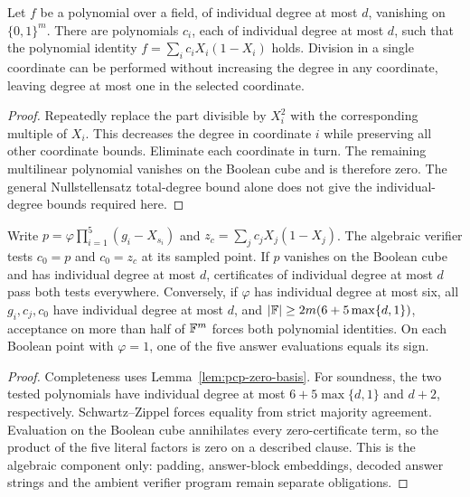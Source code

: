 \begin{lemma}
\label{lem:pcp-zero-basis}
\leanok
Let $f$ be a polynomial over a field, of individual degree at most $d$, vanishing
on $\{0,1\}^m$. There are polynomials $c_i$, each of individual degree at most $d$,
such that the polynomial identity $f=\sum_i c_i X_i(1-X_i)$ holds.
Division in a single coordinate can be performed without increasing the degree in
any coordinate, leaving degree at most one in the selected coordinate.
\end{lemma}

\begin{proof}
\leanok
Repeatedly replace the part divisible by $X_i^2$ with the corresponding multiple
of $X_i$. This decreases the degree in coordinate $i$ while preserving all other
coordinate bounds. Eliminate each coordinate in turn. The remaining multilinear
polynomial vanishes on the Boolean cube and is therefore zero. The general
Nullstellensatz total-degree bound alone does not give the individual-degree
bounds required here.
\end{proof}

\begin{lemma}
\label{lem:pcp-algebra-tests}
\leanok
Write $p=\varphi\prod_{i=1}^5(g_i-X_{s_i})$ and
$z_c=\sum_j c_jX_j(1-X_j)$. The algebraic verifier tests $c_0=p$ and $c_0=z_c$
at its sampled point. If $p$ vanishes on the Boolean cube and has individual
degree at most $d$, certificates of individual degree at most $d$ pass both tests
everywhere. Conversely, if $\varphi$ has individual degree at most six, all
$g_i,c_j,c_0$ have individual degree at most $d$, and
$|\mathbb{F}|\geq 2m(6+5\max\{d,1\})$, acceptance on more than half of $\mathbb{F}^m$ forces
both polynomial identities. On each Boolean point with $\varphi=1$, one of the
five answer evaluations equals its sign.
\end{lemma}

\begin{proof}
\leanok
Completeness uses Lemma~\ref{lem:pcp-zero-basis}. For soundness, the two tested
polynomials have individual degree at most $6+5\max\{d,1\}$ and $d+2$,
respectively. Schwartz--Zippel forces equality from strict majority agreement.
Evaluation on the Boolean cube annihilates every zero-certificate term, so the
product of the five literal factors is zero on a described clause.
This is the algebraic component only: padding, answer-block embeddings, decoded
answer strings and the ambient verifier program remain separate obligations.
\end{proof}

